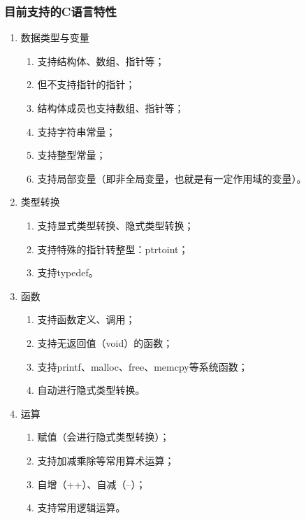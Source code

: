 \documentclass[a4paper]{article}
\begin{document}
\begin{CJK*}{UTF8}{gbsn}
    \subsubsection{目前支持的C语言特性}
    \begin{enumerate}
        \item 数据类型与变量
        \begin{enumerate}
            \item 支持结构体、数组、指针等；
            \item 但不支持指针的指针；
            \item 结构体成员也支持数组、指针等；
            \item 支持字符串常量；
            \item 支持整型常量；
            \item 支持局部变量（即非全局变量，也就是有一定作用域的变量）。
        \end{enumerate}
        
        \item 类型转换
        \begin{enumerate}
            \item 支持显式类型转换、隐式类型转换；
            \item 支持特殊的指针转整型：ptrtoint；
            \item 支持typedef。
        \end{enumerate}
        
        \item 函数
        \begin{enumerate}
            \item 支持函数定义、调用；
            \item 支持无返回值（void）的函数；
            \item 支持printf、malloc、free、memcpy等系统函数；
            \item 自动进行隐式类型转换。
        \end{enumerate}
        
        \item 运算
        \begin{enumerate}
            \item 赋值（会进行隐式类型转换）；
            \item 支持加减乘除等常用算术运算；
            \item 自增（++）、自减（--）；
            \item 支持常用逻辑运算。
        \end{enumerate}


\end{enumerate}
\end{CJK*}
\end{document}
